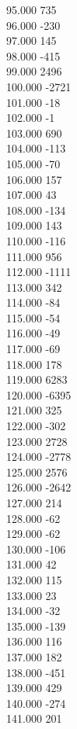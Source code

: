 { 95.000	735 \\
 96.000	-230 \\
 97.000	145 \\
 98.000	-415 \\
 99.000	2496 \\
 100.000	-2721 \\
 101.000	-18 \\
 102.000	-1 \\
 103.000	690 \\
 104.000	-113 \\
 105.000	-70 \\
 106.000	157 \\
 107.000	43 \\
 108.000	-134 \\
 109.000	143 \\
 110.000	-116 \\
 111.000	956 \\
 112.000	-1111 \\
 113.000	342 \\
 114.000	-84 \\
 115.000	-54 \\
 116.000	-49 \\
 117.000	-69 \\
 118.000	178 \\
 119.000	6283 \\
 120.000	-6395 \\
 121.000	325 \\
 122.000	-302 \\
 123.000	2728 \\
 124.000	-2778 \\
 125.000	2576 \\
 126.000	-2642 \\
 127.000	214 \\
 128.000	-62 \\
 129.000	-62 \\
 130.000	-106 \\
 131.000	42 \\
 132.000	115 \\
 133.000	23 \\
 134.000	-32 \\
 135.000	-139 \\
 136.000	116 \\
 137.000	182 \\
 138.000	-451 \\
 139.000	429 \\
 140.000	-274 \\
 141.000	201 \\
}
